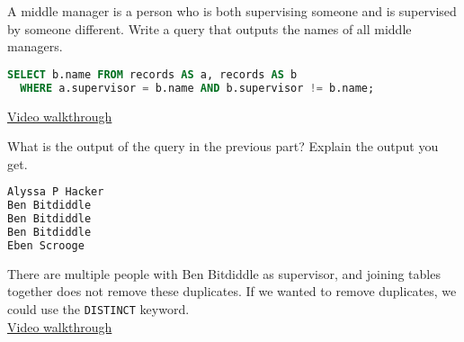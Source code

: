 \question A middle manager is a person who is both supervising someone and is
supervised by someone different. Write a query that outputs the names of all
middle managers.
\begin{solution}[1.5in]
\begin{lstlisting}[language=SQL]
SELECT b.name FROM records AS a, records AS b
  WHERE a.supervisor = b.name AND b.supervisor != b.name;
\end{lstlisting}
\href{https://youtu.be/BIV5O1U9Zdw?t=13m28s}{Video walkthrough}
\end{solution}

\question What is the output of the query in the previous part? Explain the
output you get.
\begin{solution}[1.5in]
\begin{lstlisting}[language=SQL]
Alyssa P Hacker
Ben Bitdiddle
Ben Bitdiddle
Ben Bitdiddle
Eben Scrooge
\end{lstlisting}
There are multiple people with Ben Bitdiddle as supervisor, and joining tables
together does not remove these duplicates. If we wanted to remove duplicates, we
could use the \texttt{DISTINCT} keyword.\\
\href{https://youtu.be/BIV5O1U9Zdw?t=15m49s}{Video walkthrough}
\end{solution}
